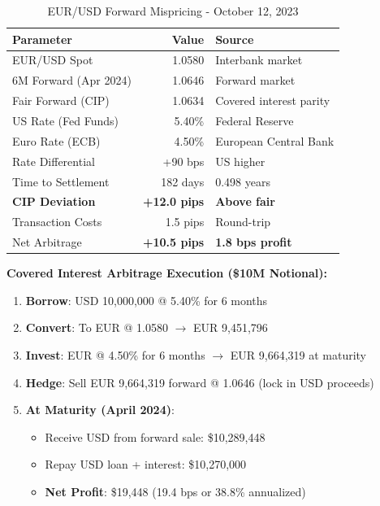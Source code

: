 \documentclass[12pt,a4paper]{article}
\begin{document}
\begin{table}[H]
\centering
\caption{EUR/USD Forward Mispricing - October 12, 2023}
\label{tab:case_eurusd}
\begin{tabular}{@{}lrl@{}}
\toprule
\textbf{Parameter} & \textbf{Value} & \textbf{Source} \\
\midrule
EUR/USD Spot & 1.0580 & Interbank market \\
6M Forward (Apr 2024) & 1.0646 & Forward market \\
Fair Forward (CIP) & 1.0634 & Covered interest parity \\
\midrule
US Rate (Fed Funds) & 5.40\% & Federal Reserve \\
Euro Rate (ECB) & 4.50\% & European Central Bank \\
Rate Differential & +90 bps & US higher \\
Time to Settlement & 182 days & 0.498 years \\
\midrule
\textbf{CIP Deviation} & \textbf{+12.0 pips} & \textbf{Above fair} \\
Transaction Costs & 1.5 pips & Round-trip \\
Net Arbitrage & \textbf{+10.5 pips} & \textbf{1.8 bps profit} \\
\bottomrule
\end{tabular}
\end{table}

\textbf{Covered Interest Arbitrage Execution (\$10M Notional):}

\begin{enumerate}
    \item \textbf{Borrow}: USD 10,000,000 @ 5.40\% for 6 months
    \item \textbf{Convert}: To EUR @ 1.0580 $\rightarrow$ EUR 9,451,796
    \item \textbf{Invest}: EUR @ 4.50\% for 6 months $\rightarrow$ EUR 9,664,319 at maturity
    \item \textbf{Hedge}: Sell EUR 9,664,319 forward @ 1.0646 (lock in USD proceeds)
    \item \textbf{At Maturity (April 2024)}:
    \begin{itemize}
        \item Receive USD from forward sale: \$10,289,448
        \item Repay USD loan + interest: \$10,270,000
        \item \textbf{Net Profit}: \$19,448 (19.4 bps or 38.8\% annualized)
    \end{itemize}
\end{enumerate}
\end{document}
